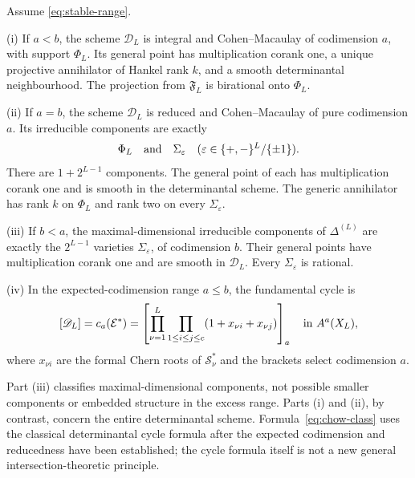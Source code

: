 \begin{theorem}\label{thm:structure}
Assume \eqref{eq:stable-range}.

\smallskip\noindent
\textup{(i)} If $a<b$, the scheme $\mathscr D_L$ is integral and Cohen--Macaulay of codimension $a$, with support $\Phi_L$. Its general point has multiplication corank one, a unique projective annihilator of Hankel rank $k$, and a smooth determinantal neighbourhood. The projection from $\mathfrak F_L$ is birational onto $\Phi_L$.

\smallskip\noindent
\textup{(ii)} If $a=b$, the scheme $\mathscr D_L$ is reduced and Cohen--Macaulay of pure codimension $a$. Its irreducible components are exactly
\[
 \Phi_L\quad\hbox{and}\quad
 \Sigma_\varepsilon\quad
 (\varepsilon\in\{+,-\}^L/\{\pm1\}).
\]
There are $1+2^{L-1}$ components. The general point of each has multiplication corank one and is smooth in the determinantal scheme. The generic annihilator has rank $k$ on $\Phi_L$ and rank two on every $\Sigma_\varepsilon$.

\smallskip\noindent
\textup{(iii)} If $b<a$, the maximal-dimensional irreducible components of $\Delta^{(L)}$ are exactly the $2^{L-1}$ varieties $\Sigma_\varepsilon$, of codimension $b$. Their general points have multiplication corank one and are smooth in $\mathscr D_L$. Every $\Sigma_\varepsilon$ is rational.

\smallskip\noindent
\textup{(iv)} In the expected-codimension range $a\le b$, the fundamental cycle is
\begin{equation}\label{eq:chow-class}
 [\mathscr D_L]=c_a(\mathcal E^*)
 =\left[\prod_{\nu=1}^L\prod_{1\le i\le j\le c}
                         (1+x_{\nu i}+x_{\nu j})\right]_a
       \quad\hbox{in }A^a(X_L),
\end{equation}
where $x_{\nu i}$ are the formal Chern roots of $\mathcal S_\nu^*$ and the brackets select codimension $a$.
\end{theorem}
Part (iii) classifies maximal-dimensional components, not possible smaller components or embedded structure in the excess range. Parts (i) and (ii), by contrast, concern the entire determinantal scheme. Formula~\eqref{eq:chow-class} uses the classical determinantal cycle formula after the expected codimension and reducedness have been established; the cycle formula itself is not a new general intersection-theoretic principle.

